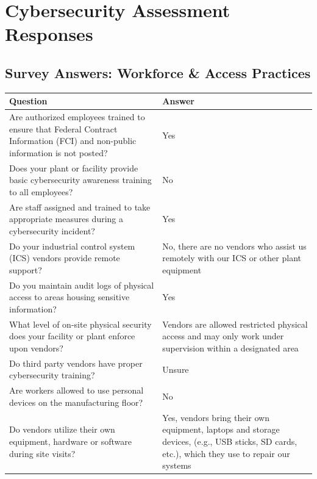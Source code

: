 
\section{Cybersecurity Assessment Responses}

\subsection*{Survey Answers: Workforce \& Access Practices}
\begin{table}[h]
\begin{tabularx}{\textwidth}{>{\raggedright\arraybackslash}X >{\raggedright\arraybackslash}X}
\toprule
\textbf{Question} & \textbf{Answer} \\
\midrule
Are authorized employees trained to ensure that Federal Contract Information (FCI) and non-public information is not posted? & Yes \\
\addlinespace
Does your plant or facility provide basic cybersecurity awareness training to all employees? & No \\
\addlinespace
Are staff assigned and trained to take appropriate measures during a cybersecurity incident? & Yes \\
\addlinespace
Do your industrial control system (ICS) vendors provide remote support? & No, there are no vendors who assist us remotely with our ICS or other plant equipment \\
\addlinespace
Do you maintain audit logs of physical access to areas housing sensitive information? & Yes\\
\addlinespace
What level of on-site physical security does your facility or plant enforce upon vendors? & Vendors are allowed restricted physical access and may only work under supervision within a designated area \\
\addlinespace
Do third party vendors have proper cybersecurity training? & Unsure \\
\addlinespace
Are workers allowed to use personal devices on the manufacturing floor?
& No\\

Do vendors utilize their own equipment, hardware or software during site visits? & Yes, vendors bring their own equipment, laptops and storage devices, (e.g., USB sticks, SD cards, etc.), which they use to repair our systems \\
\bottomrule
\end{tabularx}
\end{table}

